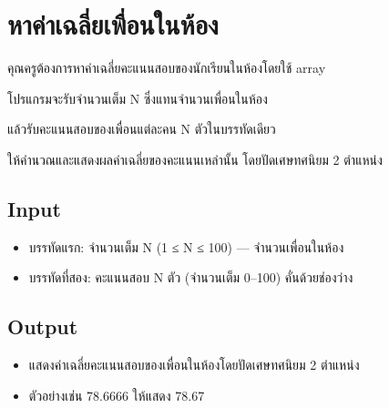 \documentclass{article}
\begin{document}
\section*{หาค่าเฉลี่ยเพื่อนในห้อง}

คุณครูต้องการหาค่าเฉลี่ยคะแนนสอบของนักเรียนในห้องโดยใช้ array



โปรแกรมจะรับจำนวนเต็ม N ซึ่งแทนจำนวนเพื่อนในห้อง



แล้วรับคะแนนสอบของเพื่อนแต่ละคน N ตัวในบรรทัดเดียว



ให้คำนวณและแสดงผลค่าเฉลี่ยของคะแนนเหล่านั้น โดยปัดเศษทศนิยม 2 ตำแหน่ง



\subsection*{Input}
\begin{itemize}

\item

  บรรทัดแรก: จำนวนเต็ม N (1 ≤ N ≤ 100) --- จำนวนเพื่อนในห้อง

\item

  บรรทัดที่สอง: คะแนนสอบ N ตัว (จำนวนเต็ม 0--100) คั่นด้วยช่องว่าง

\end{itemize}



\subsection*{Output}
\begin{itemize}

\item

  แสดงค่าเฉลี่ยคะแนนสอบของเพื่อนในห้องโดยปัดเศษทศนิยม 2 ตำแหน่ง

\item

  ตัวอย่างเช่น 78.6666 ให้แสดง 78.67

\end{itemize}
\end{document}
